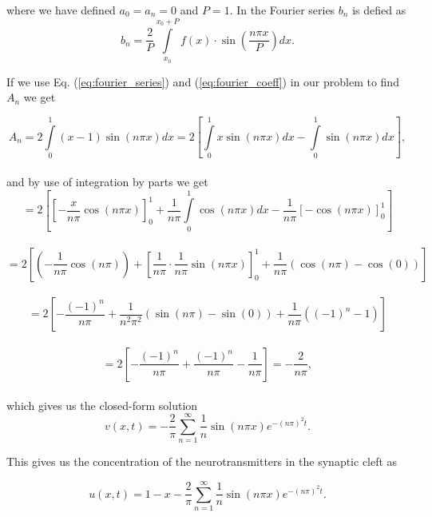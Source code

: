 \documentclass[12pt]{article}
\begin{document}
\begin{flushleft}
where we have defined $a_0 = a_n = 0$ and $P = 1$. In the Fourier series $b_n$ is defied as 
\vspace{5mm}
\begin{equation}\label{eq:fourier_coeff}
b_n = \frac{2}{P}\int\limits_	{x_0}^{x_0+P}f(x)\cdot\sin\left(\frac{n\pi x}{P}\right) dx.
\end{equation}
\vspace{5mm}

If we use Eq. (\ref{eq:fourier_series}) and (\ref{eq:fourier_coeff}) in our problem to find $A_n$ we get

\vspace{5mm}
$$A_n = 2\int\limits_0^1 (x-1)\sin\left(n\pi x\right)dx = 2\left[\int\limits_0^1x\sin(n\pi x)dx - \int\limits_0^1\sin(n\pi x)dx\right],$$\\
\vspace{5mm}
and by use of integration by parts we get
\vspace{5mm}
$$ = 2\left[\left[-\frac{x}{n\pi}\cos(n\pi x)\right]_0^1 + \frac{1}{n\pi}\int\limits_0^1\cos(n\pi x)dx - \frac{1}{n\pi}\left[-\cos(n\pi x)\right]_0^1\right]$$\\
\vspace{5mm}
$$ = 2\left[\left(-\frac{1}{n\pi}\cos(n\pi)\right) + \left[\frac{1}{n\pi}\cdot\frac{1}{n\pi}\sin(n\pi x)\right]_0^1+\frac{1}{n\pi}\left(\cos(n\pi) - \cos(0)\right)\right]$$\\
\vspace{5mm}
$$ = 2\left[-\frac{(-1)^n}{n\pi} + \frac{1}{n^2\pi^2}\left(\sin(n\pi) - \sin(0)\right)+\frac{1}{n\pi}\left((-1)^n - 1\right)\right]$$\\
\vspace{5mm}
$$ = 2\left[-\frac{(-1)^n}{n\pi} + \frac{(-1)^n}{n\pi} -\frac{1}{n\pi}\right] = -\frac{2}{n\pi},$$\\
\vspace{5mm}
which gives us the closed-form solution
\vspace{5mm}
\begin{equation}\label{eq:closed_form_solution}
v(x,t) = -\frac{2}{\pi}\sum\limits_{n=1}^{\infty} \frac{1}{n}\sin\left(n\pi x\right)e^{-(n\pi)^2t}.
\end{equation}
\vspace{5mm}

This gives us the concentration of the neurotransmitters in the synaptic cleft as

\vspace{5mm}
$$u(x,t) =   1 - x-\frac{2}{\pi}\sum\limits_{n=1}^{\infty} \frac{1}{n}\sin\left(n\pi x\right)e^{-(n\pi)^2t}.$$\\
\vspace{5mm}




\end{flushleft}
\end{document}
